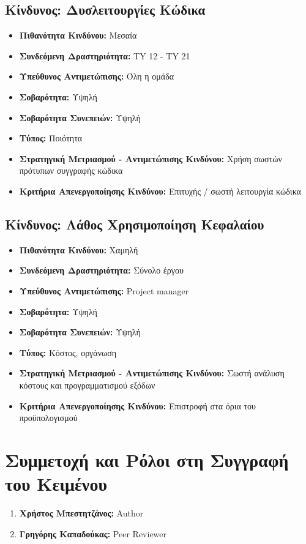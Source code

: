 \documentclass[12pt,a4paper]{article}
\begin{document}
\subsection{Κίνδυνος: Δυσλειτουργίες Κώδικα}
\begin{itemize}
	\item \textbf{Πιθανότητα Κινδύνου:} Μεσαία
	\item \textbf{Συνδεόμενη Δραστηριότητα:} TY 12 - TY 21
	\item \textbf{Υπεύθυνος Αντιμετώπισης:} Όλη η ομάδα
	\item \textbf{Σοβαρότητα:} Υψηλή
	\item \textbf{Σοβαρότητα Συνεπειών:} Υψηλή
	\item \textbf{Τύπος:} Ποιότητα
	\item \textbf{Στρατηγική Μετριασμού - Αντιμετώπισης Κινδύνου:} Χρήση σωστών πρότυπων συγγραφής κώδικα
	\item \textbf{Κριτήρια Απενεργοποίησης Κινδύνου:} Επιτυχής / σωστή λειτουργία κώδικα
\end{itemize}

\subsection{Κίνδυνος: Λάθος Χρησιμοποίηση Κεφαλαίου}
\begin{itemize}
	\item \textbf{Πιθανότητα Κινδύνου:} Χαμηλή
	\item \textbf{Συνδεόμενη Δραστηριότητα:} Σύνολο έργου
	\item \textbf{Υπεύθυνος Αντιμετώπισης:} Project manager
	\item \textbf{Σοβαρότητα:} Υψηλή
	\item \textbf{Σοβαρότητα Συνεπειών:} Υψηλή
	\item \textbf{Τύπος:} Κόστος, οργάνωση
	\item \textbf{Στρατηγική Μετριασμού - Αντιμετώπισης Κινδύνου:} Σωστή ανάλυση κόστους και προγραμματισμού εξόδων 
	\item \textbf{Κριτήρια Απενεργοποίησης Κινδύνου:} Επιστροφή στα όρια του προϋπολογισμού
\end{itemize}

\section{Συμμετοχή και Ρόλοι στη Συγγραφή του Κειμένου}
\begin{enumerate}
	\item \textbf{Χρήστος Μπεστητζάνος:} Author
	\item \textbf{Γρηγόρης Καπαδούκας:} Peer Reviewer
\end{enumerate}
\end{document}
